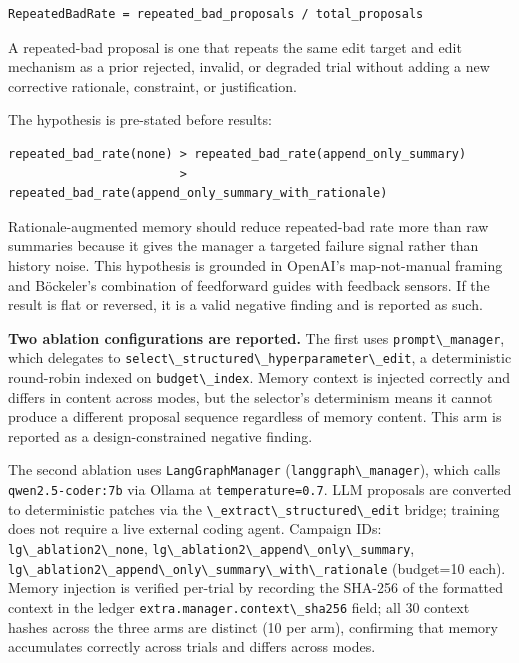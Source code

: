 \begin{lstlisting}
RepeatedBadRate = repeated_bad_proposals / total_proposals
\end{lstlisting}

A repeated-bad proposal is one that repeats the same edit target and edit mechanism as a prior rejected, invalid, or degraded trial without adding a new corrective rationale, constraint, or justification.

The hypothesis is pre-stated before results:

\begin{lstlisting}
repeated_bad_rate(none) > repeated_bad_rate(append_only_summary)
                        > repeated_bad_rate(append_only_summary_with_rationale)
\end{lstlisting}

Rationale-augmented memory should reduce repeated-bad rate more than raw summaries because it gives the manager a targeted failure signal rather than history noise. This hypothesis is grounded in OpenAI's map-not-manual framing and Böckeler's combination of feedforward guides with feedback sensors. If the result is flat or reversed, it is a valid negative finding and is reported as such.

\textbf{Two ablation configurations are reported.} The first uses \passthrough{\lstinline!prompt\_manager!}, which delegates to \passthrough{\lstinline!select\_structured\_hyperparameter\_edit!}, a deterministic round-robin indexed on \passthrough{\lstinline!budget\_index!}. Memory context is injected correctly and differs in content across modes, but the selector's determinism means it cannot produce a different proposal sequence regardless of memory content. This arm is reported as a design-constrained negative finding.

The second ablation uses \passthrough{\lstinline!LangGraphManager!} (\passthrough{\lstinline!langgraph\_manager!}), which calls \passthrough{\lstinline!qwen2.5-coder:7b!} via Ollama at \passthrough{\lstinline!temperature=0.7!}. LLM proposals are converted to deterministic patches via the \passthrough{\lstinline!\_extract\_structured\_edit!} bridge; training does not require a live external coding agent. Campaign IDs: \passthrough{\lstinline!lg\_ablation2\_none!}, \passthrough{\lstinline!lg\_ablation2\_append\_only\_summary!}, \passthrough{\lstinline!lg\_ablation2\_append\_only\_summary\_with\_rationale!} (budget=10 each). Memory injection is verified per-trial by recording the SHA-256 of the formatted context in the ledger \passthrough{\lstinline!extra.manager.context\_sha256!} field; all 30 context hashes across the three arms are distinct (10 per arm), confirming that memory accumulates correctly across trials and differs across modes.

